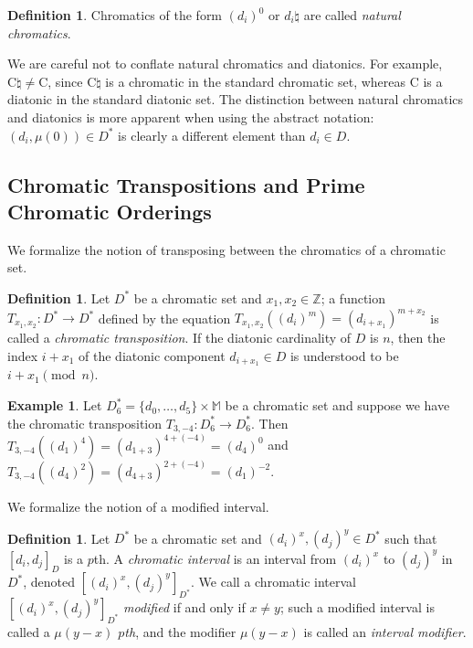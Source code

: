 \documentclass{article}
\theoremstyle{plain}
\theoremstyle{definition}
\newtheorem{definition}[theorem]{Definition}
\newtheorem{example}[theorem]{Example}
\theoremstyle{remark}
\begin{document}
\begin{definition}
Chromatics of the form $(d_i)^0$ or $d_i\natural$ are called \textit{natural chromatics}.
\end{definition}

We are careful not to conflate natural chromatics and diatonics. For example, $\textrm{C}\natural\ne\textrm{C}$, since C$\natural$ is a chromatic in the standard chromatic set, whereas C is a diatonic in the standard diatonic set. The distinction between natural chromatics and diatonics is more apparent when using the abstract notation: $(d_i,\mu(0))\in D^\ast$ is clearly a different element than $d_i\in D$.

\subsection{Chromatic Transpositions and Prime Chromatic Orderings}
\label{SSEC.Chromatic Transpositions and Prime Chromatic Orderings}

We formalize the notion of transposing between the chromatics of a chromatic set.

\begin{definition}
	Let $D^\ast$ be a chromatic set and $x_1,x_2\in\mathbb{Z}$; a function $T_{x_1,x_2}:D^\ast\to D^\ast$ defined by the equation $T_{x_1,x_2}((d_i)^m)=(d_{i+x_1})^{m+x_2}$ is called a \textit{chromatic transposition}. If the diatonic cardinality of $D$ is $n$, then the index $i+x_1$ of the diatonic component $d_{i+x_1}\in D$ is understood to be $i+x_1\pmod{n}$.
\end{definition}

\begin{example}
	Let $D_6^\ast=\{d_0,\dots,d_5\}\times\mathbb{M}$ be a chromatic set and suppose we have the chromatic transposition $T_{3,-4}:D_6^\ast\to D_6^\ast$. Then $T_{3,-4}((d_1)^4)=(d_{1+3})^{4+(-4)}=(d_4)^0$ and $T_{3,-4}((d_4)^2)=(d_{4+3})^{2+(-4)}=(d_1)^{-2}$.
\end{example}

We formalize the notion of a modified interval.

\begin{definition}
	Let $D^\ast$ be a chromatic set and $(d_i)^x,(d_j)^y\in D^\ast$ such that $[d_i,d_j]_D$ is a $p$th. A \textit{chromatic interval} is an interval from $(d_i)^x$ to $(d_j)^y$ in $D^\ast$, denoted $[(d_i)^x,(d_j)^y]_{D^\ast}$. We call a chromatic interval $[(d_i)^x,(d_j)^y]_{D^\ast}$ \textit{modified} if and only if $x\ne y$; such a modified interval is called a \textit{$\mu(y-x)$ $p$th}, and the modifier $\mu(y-x)$ is called an \textit{interval modifier}.
\end{definition}
\end{document}
